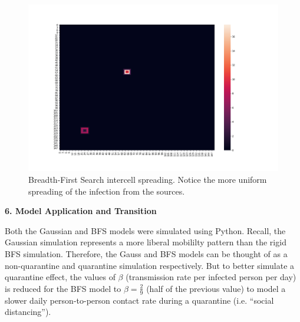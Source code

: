 \documentclass[a4paper]{article}
\begin{document}
\begin{figure}[ht]
  \includegraphics[scale=0.25]{../no_quarantine/no_quarantine_heatmap_3.png}
  \centering
  \caption{Breadth-First Search intercell spreading. Notice the more uniform
  spreading of the infection from the sources.}
\end{figure}

\begin{center}
  \textbf{6. Model Application and Transition}
\end{center}

Both the Gaussian and BFS models were simulated using Python. Recall, the
Gaussian simulation represents a more liberal mobililty pattern than the rigid BFS simulation.
Therefore, the Gauss and BFS models can be thought of as a non-quarantine and quarantine
simulation respectively. But to better simulate a quarantine effect, the values
of $\beta$ (transmission rate per infected person per day) is reduced for the BFS
model to $\beta = \frac{2}{9}$ (half of the previous value) to model a slower daily 
person-to-person contact rate during a quarantine (i.e. ``social distancing'').
\end{document}
